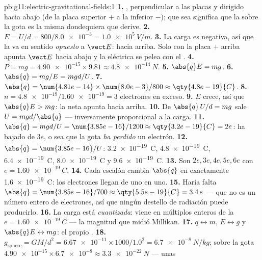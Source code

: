 \begin{solution}{pb:g11:electric-gravitational-fields:1}
\textbf{1.} , perpendicular a las placas y dirigido hacia abajo
(de la placa superior $+$ a la inferior $-$); que sea  significa
que la  sobre la gota es la misma dondequiera que derive.
\textbf{2.} $E = U/d = 800 / \num{8.0e-3} = \qty{1.0e5}{V/m}$.
\textbf{3.} La carga es negativa, así que la  va en sentido
\emph{opuesto} a $\vect E$: hacia arriba. Solo con la placa $+$ arriba
apunta $\vect E$ hacia abajo y la  eléctrica se pelea con el .
\textbf{4.} $P = mg = \num{4.90e-15} \times 9.81 \approx
\qty{4.8e-14}{N}$.
\textbf{5.} $\abs{q}E = mg$.
\textbf{6.} $\abs{q} = mg/E = mgd/U$.
\textbf{7.} $\abs{q} = \num{4.81e-14} \times \num{8.0e-3} / 800
\approx \qty{4.8e-19}{C}$.
\textbf{8.} $n = \num{4.8e-19} / \num{1.60e-19} = 3$ electrones en
exceso.
\textbf{9.} $E$ crece, así que $\abs{q}E > mg$: la  neta apunta
hacia arriba.
\textbf{10.} De $\abs{q}\,U/d = mg$ sale $U = mgd/\abs{q}$ ---
inversamente proporcional a la carga.
\textbf{11.} $\abs{q} = mgd/U = \num{3.85e-16}/1200 \approx
\qty{3.2e-19}{C} = 2e$: ha bajado de $3e$, o sea que la gota \emph{ha
perdido} un electrón.
\textbf{12.} $\abs{q} = \num{3.85e-16}/U$: \qty{3.2e-19}{C},
\qty{4.8e-19}{C}, \qty{6.4e-19}{C}, \qty{8.0e-19}{C} y
\qty{9.6e-19}{C}.
\textbf{13.} Son $2e, 3e, 4e, 5e, 6e$ con $e = \qty{1.60e-19}{C}$.
\textbf{14.} Cada escalón cambia $\abs{q}$ en exactamente
\qty{1.6e-19}{C}: los electrones llegan de uno en uno.
\textbf{15.} Haría falta $\abs{q} = \num{3.85e-16}/700 \approx
\qty{5.5e-19}{C} = 3.4\,e$ --- que no es un número entero de
electrones, así que ningún destello de radiación puede producirlo.
\textbf{16.} La carga está \emph{cuantizada}: viene en múltiplos enteros
de la  $e = \qty{1.60e-19}{C}$ --- la magnitud que midió
Millikan.
\textbf{17.} $q \leftrightarrow m$, $E \leftrightarrow g$ y
$\abs{q}E \leftrightarrow mg$: el propio .
\textbf{18.} $g_{\text{sphere}} = GM/d^2 = \num{6.67e-11} \times 1000 /
1.0^2 = \qty{6.7e-8}{N/kg}$;  sobre la gota
$\num{4.90e-15} \times \num{6.7e-8} \approx \qty{3.3e-22}{N}$ --- unas

\end{solution}

